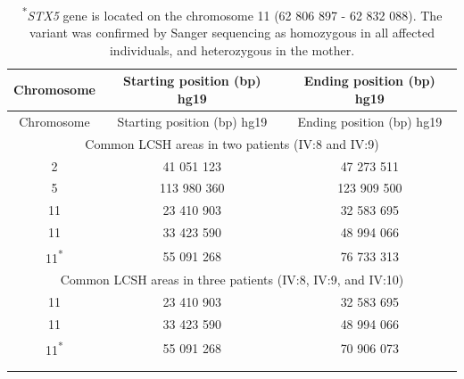 \footnotesize
\begin{longtable}[c]{c c c}
    \caption{\textbf{Chromosomal microarray analysis}} \\
    Chromosome & Starting position (bp) hg19 & Ending position (bp) hg19 \\
    \hline
    \endfirsthead
    Chromosome & Starting position (bp) hg19 & Ending position (bp) hg19 \\
    \hline  
    \endhead
    \multicolumn{3}{c}{Common LCSH areas in two patients (IV:8 and IV:9)} \\
    2 & 41 051 123 & 47 273 511 \\
    5 & 113 980 360 & 123 909 500 \\
    11 & 23 410 903 & 32 583 695 \\
    11 & 33 423 590 & 48 994 066 \\
    11\textsuperscript{*} & 55 091 268 & 76 733 313 \\
    \multicolumn{3}{c}{Common LCSH areas in three patients (IV:8, IV:9, and IV:10)} \\
    11 & 23 410 903 & 32 583 695 \\
    11 & 33 423 590 & 48 994 066 \\
    11\textsuperscript{*} & 55 091 268 & 70 906 073 \\
    \caption*{\textsuperscript{*}\emph{STX5} gene is located on the chromosome 11 (62 806 897 - 62 832 088). The variant was confirmed by Sanger sequencing as homozygous in all affected individuals, and heterozygous in the mother.} \\  
    \label{tbl:ch6tbl5}
\end{longtable}

\clearpage

